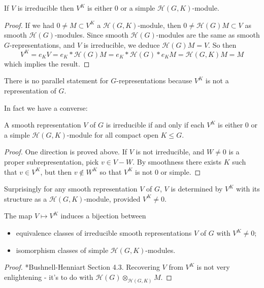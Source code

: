 \begin{lemma}
    If $V$ is irreducible then $V^K$ is either 0 or a simple $\mathcal H(G,K)$-module.
\end{lemma}
\begin{proof}
If we had $0 \neq M \subset V^K$ a $\mathcal H(G,K)$-module, then $0 \neq \mathcal H(G) M \subset V$ as smooth $\mathcal H(G)$-modules. Since smooth $\mathcal H(G)$-modules are the same as smooth $G$-representations, and $V$ is irreducible, we deduce $\mathcal H(G)M = V$. So then $$V^K = e_K V = e_K * \mathcal H(G)M = e_K * \mathcal H(G) *e_K M = \mathcal H(G,K)M=M$$ which implies the result.
\end{proof}
\begin{rem}
    There is no parallel statement for $G$-representations because $V^K$ is not a representation of $G$.
\end{rem}

In fact we have a converse:
\begin{lemma}
    A smooth representation $V$ of $G$ is irreducible if and only if each $V^K$ is either 0 or a simple $\mathcal H(G,K)$-module for all compact open $K \leq G$.
\end{lemma}
\begin{proof}
    One direction is proved above. If $V$ is not irreducible, and $W \neq 0$ is a proper subrepresentation, pick $v \in V-W$. By smoothness there exists $K$ such that $v \in V^K$, but then $v \not\in W^K$ so that $V^K$ is not 0 or simple.
\end{proof}

Surprisingly for any smooth representation $V$ of $G$, $V$ is determined by $V^K$ with its structure as a $\mathcal H(G,K)$-module, provided $V^K \neq 0$.

\begin{prop}
    The map $V \mapsto V^K$ induces a bijection between
    \begin{itemize}
        \item equivalence classes of irreducible smooth representations $V$ of $G$ with $V^K \neq 0$;
        \item isomorphism classes of simple $\mathcal H(G,K)$-modules.
    \end{itemize}
\end{prop}
\begin{proof}
    *Bushnell-Henniart Section 4.3. Recovering $V$ from $V^K$ is not very enlightening - it's to do with $\mathcal H(G) \otimes_{\mathcal H(G,K)} M$.
\end{proof}

